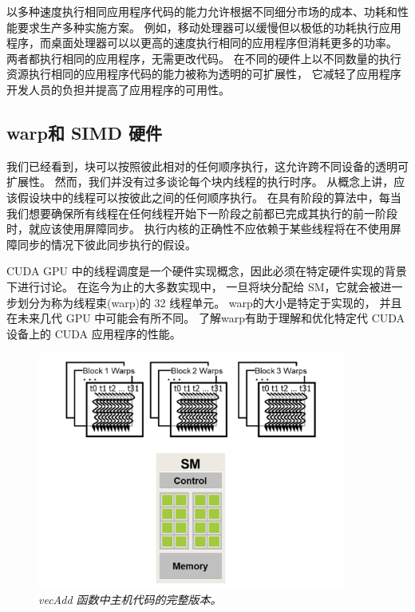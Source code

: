 以多种速度执行相同应用程序代码的能力允许根据不同细分市场的成本、功耗和性能要求生产多种实施方案。 
例如，移动处理器可以缓慢但以极低的功耗执行应用程序，而桌面处理器可以以更高的速度执行相同的应用程序但消耗更多的功率。 
两者都执行相同的应用程序，无需更改代码。 
在不同的硬件上以不同数量的执行资源执行相同的应用程序代码的能力被称为透明的可扩展性，
它减轻了应用程序开发人员的负担并提高了应用程序的可用性。

\subsection{warp和 SIMD 硬件}
我们已经看到，块可以按照彼此相对的任何顺序执行，这允许跨不同设备的透明可扩展性。 
然而，我们并没有过多谈论每个块内线程的执行时序。 从概念上讲，应该假设块中的线程可以按彼此之间的任何顺序执行。 
在具有阶段的算法中，每当我们想要确保所有线程在任何线程开始下一阶段之前都已完成其执行的前一阶段时，就应该使用屏障同步。 
执行内核的正确性不应依赖于某些线程将在不使用屏障同步的情况下彼此同步执行的假设。

CUDA GPU 中的线程调度是一个硬件实现概念，因此必须在特定硬件实现的背景下进行讨论。 在迄今为止的大多数实现中，
一旦将块分配给 SM，它就会被进一步划分为称为线程束(warp)的 32 线程单元。 warp的大小是特定于实现的，
并且在未来几代 GPU 中可能会有所不同。 了解warp有助于理解和优化特定代 CUDA 设备上的 CUDA 应用程序的性能。

\begin{figure}[H]
	\centering
	\includegraphics[width=0.9\textwidth]{figs/F4.6.png}
	\caption{\textit{\color{red} vecAdd 函数中主机代码的完整版本。}}
\end{figure}

